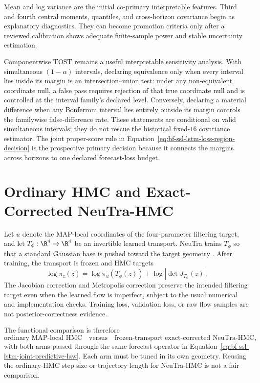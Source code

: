 Mean and log variance are the initial co-primary interpretable features.
Third and fourth central moments, quantiles, and cross-horizon covariance begin
as explanatory diagnostics.  They can become promotion criteria only after a
reviewed calibration shows adequate finite-sample power and stable uncertainty
estimation.

Componentwise TOST remains a useful interpretable sensitivity analysis.  With
simultaneous $(1-\alpha)$ intervals, declaring equivalence only when every
interval lies inside its margin is an intersection--union test: under any
non-equivalent coordinate null, a false pass requires rejection of that true
coordinate null and is controlled at the interval family's declared level.
Conversely, declaring a material difference when any Bonferroni interval lies
entirely outside its margin controls the familywise false-difference rate.
These statements are conditional on valid simultaneous intervals; they do not
rescue the historical fixed-$16$ covariance estimator.  The joint
proper-score rule in Equation~\eqref{eq:bf-ssl-lstm-loss-region-decision} is the
prospective primary decision because it connects the margins across horizons
to one declared forecast-loss budget.

\section{Ordinary HMC and Exact-Corrected NeuTra-HMC}
\label{sec:bf-ssl-lstm-neutra-comparison}

Let $u$ denote the MAP-local coordinates of the four-parameter filtering
target, and let $T_\phi:\R^4\rightarrow\R^4$ be an invertible learned
transport.  NeuTra trains $T_\phi$ so that a standard Gaussian base is pushed
toward the target geometry \citep{hoffman2019neutra}.  After training, the
transport is frozen and HMC targets
\begin{equation}
  \log\pi_z(z)
  =\log\pi_u(T_\phi(z))
   +\log\left|\det J_{T_\phi}(z)\right|.
  \label{eq:bf-ssl-lstm-exact-neutra-target}
\end{equation}
The Jacobian correction and Metropolis correction preserve the intended
filtering target even when the learned flow is imperfect, subject to the usual
numerical and implementation checks.  Training loss, validation loss, or raw
flow samples are not posterior-correctness evidence.

The functional comparison is therefore
\begin{equation}
  \text{ordinary MAP-local HMC}
  \quad\text{versus}\quad
  \text{frozen-transport exact-corrected NeuTra-HMC},
  \label{eq:bf-ssl-lstm-sampler-comparison}
\end{equation}
with both arms passed through the same forecast operator in
Equation~\eqref{eq:bf-ssl-lstm-joint-predictive-law}.  Each arm must be tuned
in its own geometry.  Reusing the ordinary-HMC step size or trajectory length
for NeuTra-HMC is not a fair comparison.

